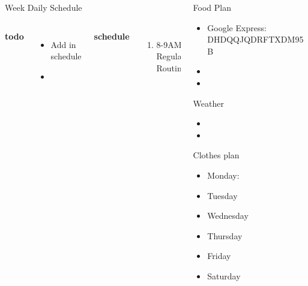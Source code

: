 \documentclass[serif, mathserif, final]{beamer}
\begin{document}
\begin{frame}
\begin{columns}
\begin{column}{0.5\linewidth}
  \begin{block}{Week Daily Schedule} 
    \begin{columns}
      \textbf{\small todo} \\ 
      \begin{itemize}
        \tiny \item \tiny Add in schedule
      \item \tiny 
      \end{itemize} 
      \textbf{\small schedule} \\
      \begin{enumerate} 
        \tiny \item \tiny 8-9AM: Regular Routines 
      \end{enumerate} 
    \end{columns} 
  \end{block} 
\end{column}

\begin{column}{0.25\linewidth}
  
  \begin{block}{Food Plan} 
    \begin{itemize}
      \tiny \item \tiny Google Express: DHDQQJQDRFTXDM95B
    \item \tiny 
    \item \tiny 
    \end{itemize}
  \end{block} 
  
  \begin{block}{Weather}
    \begin{itemize}
      \tiny \item \tiny 
    \item \tiny
    \end{itemize}
  \end{block}
  
  \begin{block}{Clothes plan} 
    \begin{itemize}
      \tiny \item \tiny Monday: 
    \item \tiny Tuesday
    \item \tiny Wednesday
    \item \tiny Thursday
    \item \tiny Friday
    \item \tiny Saturday
    \end{itemize} 
  \end{block}


\end{column}
\end{columns}
\end{frame}
\end{document}
